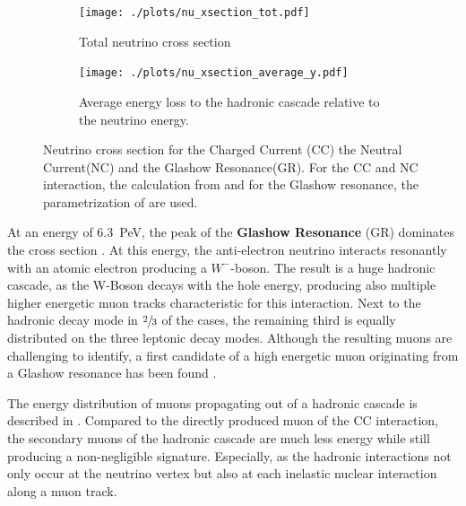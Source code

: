 \begin{figure}
    \centering
    \begin{subfigure}[t]{0.47\textwidth}
        \centering
        \texttt{[image: ./plots/nu\_xsection\_tot.pdf]}
        \caption{Total neutrino cross section}
        \label{fig:nu_xsection_tot}
    \end{subfigure}
    \hfill
    \begin{subfigure}[t]{0.47\textwidth}
        \centering
        \texttt{[image: ./plots/nu\_xsection\_average\_y.pdf]}
        \caption{Average energy loss to the hadronic cascade relative to the neutrino energy.}
        \label{fig:nu_xsection_y}
    \end{subfigure}
    \caption{Neutrino cross section for the Charged Current (CC) the Neutral Current(NC) and the Glashow Resonance(GR). For the CC and NC interaction, the calculation from \cite{CSMS11NuXsection} and for the Glashow resonance, the parametrization of \cite{Barger14} are used.}
    \label{fig:nu_xsection}
\end{figure}

At an energy of \SI{6.3}{PeV}, the peak of the \textbf{Glashow Resonance} (GR) dominates the cross section \cite{Glashow60}.
At this energy, the anti-electron neutrino interacts resonantly with an atomic electron producing a $W^-$-boson.
The result is a huge hadronic cascade, as the W-Boson decays with the hole energy, producing also multiple higher energetic muon tracks characteristic for this interaction.
Next to the hadronic decay mode in $\sfrac23$ of the cases, the remaining third is equally distributed on the three leptonic decay modes.
Although the resulting muons are challenging to identify, a first candidate of a high energetic muon originating from a Glashow resonance has been found \cite{IceCube2016Aachen}.

The energy distribution of muons propagating out of a hadronic cascade is described in \cite{Panknin09ICRC}.%
Compared to the directly produced muon of the CC interaction, the secondary muons of the hadronic cascade are much less energy while still producing a non-negligible signature.
Especially, as the hadronic interactions not only occur at the neutrino vertex but also at each inelastic nuclear interaction along a muon track.
